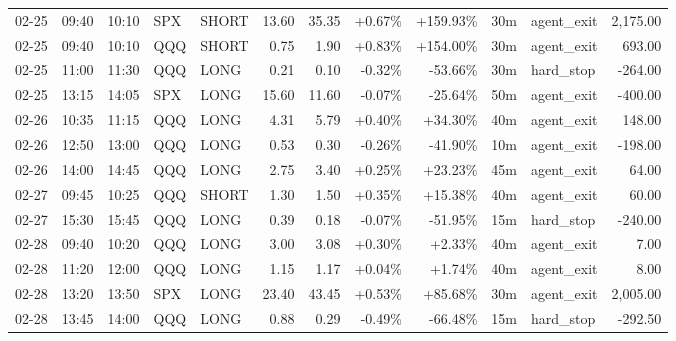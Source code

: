 \documentclass[11pt,a4paper,twoside]{article}
\begin{document}
\begin{center}
\begin{longtable}{>{\color{txtmain}}l l l l l r r r r r >{\color{txtmain}}l r}
02-25 & 09:40 & 10:10 & SPX & SHORT & 13.60 & 35.35 & \textcolor{wingreen}{+0.67\%} & \textcolor{wingreen}{+159.93\%} & 30m & agent\_exit & \textcolor{wingreen}{2,175.00} \\
02-25 & 09:40 & 10:10 & QQQ & SHORT & 0.75 & 1.90 & \textcolor{wingreen}{+0.83\%} & \textcolor{wingreen}{+154.00\%} & 30m & agent\_exit & \textcolor{wingreen}{693.00} \\
02-25 & 11:00 & 11:30 & QQQ & LONG & 0.21 & 0.10 & \textcolor{lossred}{-0.32\%} & \textcolor{lossred}{-53.66\%} & 30m & hard\_stop & \textcolor{lossred}{-264.00} \\
02-25 & 13:15 & 14:05 & SPX & LONG & 15.60 & 11.60 & \textcolor{lossred}{-0.07\%} & \textcolor{lossred}{-25.64\%} & 50m & agent\_exit & \textcolor{lossred}{-400.00} \\
02-26 & 10:35 & 11:15 & QQQ & LONG & 4.31 & 5.79 & \textcolor{wingreen}{+0.40\%} & \textcolor{wingreen}{+34.30\%} & 40m & agent\_exit & \textcolor{wingreen}{148.00} \\
02-26 & 12:50 & 13:00 & QQQ & LONG & 0.53 & 0.30 & \textcolor{lossred}{-0.26\%} & \textcolor{lossred}{-41.90\%} & 10m & agent\_exit & \textcolor{lossred}{-198.00} \\
02-26 & 14:00 & 14:45 & QQQ & LONG & 2.75 & 3.40 & \textcolor{wingreen}{+0.25\%} & \textcolor{wingreen}{+23.23\%} & 45m & agent\_exit & \textcolor{wingreen}{64.00} \\
02-27 & 09:45 & 10:25 & QQQ & SHORT & 1.30 & 1.50 & \textcolor{wingreen}{+0.35\%} & \textcolor{wingreen}{+15.38\%} & 40m & agent\_exit & \textcolor{wingreen}{60.00} \\
02-27 & 15:30 & 15:45 & QQQ & LONG & 0.39 & 0.18 & \textcolor{lossred}{-0.07\%} & \textcolor{lossred}{-51.95\%} & 15m & hard\_stop & \textcolor{lossred}{-240.00} \\
02-28 & 09:40 & 10:20 & QQQ & LONG & 3.00 & 3.08 & \textcolor{wingreen}{+0.30\%} & \textcolor{wingreen}{+2.33\%} & 40m & agent\_exit & \textcolor{wingreen}{7.00} \\
02-28 & 11:20 & 12:00 & QQQ & LONG & 1.15 & 1.17 & \textcolor{wingreen}{+0.04\%} & \textcolor{wingreen}{+1.74\%} & 40m & agent\_exit & \textcolor{wingreen}{8.00} \\
02-28 & 13:20 & 13:50 & SPX & LONG & 23.40 & 43.45 & \textcolor{wingreen}{+0.53\%} & \textcolor{wingreen}{+85.68\%} & 30m & agent\_exit & \textcolor{wingreen}{2,005.00} \\
02-28 & 13:45 & 14:00 & QQQ & LONG & 0.88 & 0.29 & \textcolor{lossred}{-0.49\%} & \textcolor{lossred}{-66.48\%} & 15m & hard\_stop & \textcolor{lossred}{-292.50} \\

\end{longtable}
\end{center}
\end{document}
